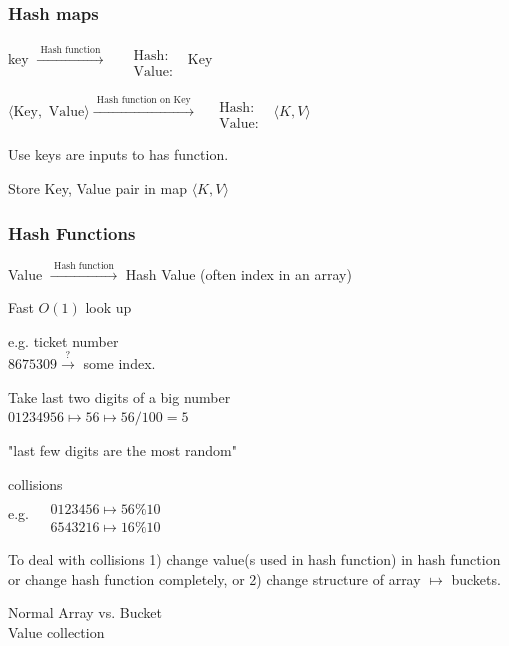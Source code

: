 \documentclass[10pt]{amsart}
\begin{document}
\subsubsection{Hash maps} 

key $\xrightarrow{ \text{ Hash function } }$  $\begin{aligned} & \quad \\ 
& \text{ Hash: } \\
& \text{ Value: } \end{aligned}$ Key 

$\langle \text{Key}, \text{ Value} \rangle \xrightarrow{ \text{ Hash function on Key } } \begin{aligned} & \quad \\ 
	& \text{ Hash: } \\
	& \text{ Value: } \end{aligned}$ \quad $\langle K , V \rangle$ 

Use keys are inputs to has function.

Store Key, Value pair in map $\langle K, V \rangle$

\subsubsection{Hash Functions}

Value $\xrightarrow{ \text{ Hash function } }$ Hash Value (often index in an array)

Fast $O(1)$ look up

e.g. ticket number  \\
$8675309 \xrightarrow{?} $ some index.

Take last two digits of a big number \\
$01234956 \mapsto 56 \mapsto 56/100 = 5$

"last few digits are the most random"

collisions \\
e.g. 
$\begin{aligned} 
	& \quad \\ 
	& 0123456 \mapsto 56 \% 10 \\
	& 6543216 \mapsto 16 \% 10 \end{aligned}$ 

To deal with collisions
1) change value(s used in hash function) in hash function or change hash function completely, or 2) change structure of array $\mapsto $ buckets.

Normal Array vs. Bucket \\
Value \phantom{ Array vs. } collection \\
\end{document}
